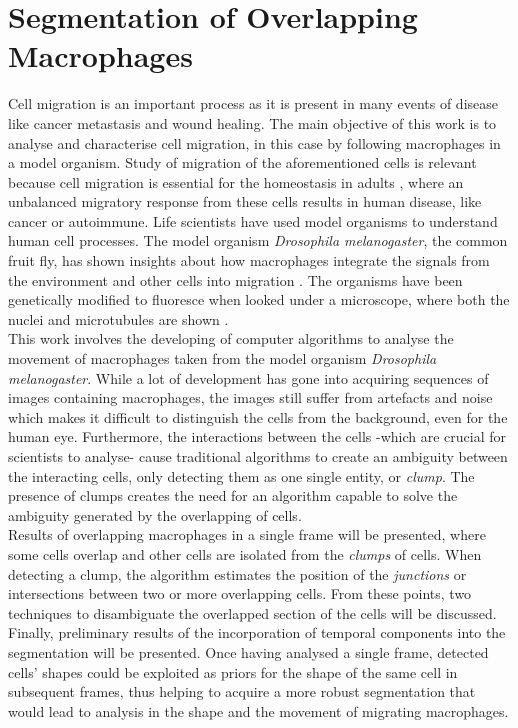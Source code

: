\section*{Segmentation of Overlapping Macrophages}
%
Cell migration is an important process as it is present in many events of
disease like cancer metastasis and wound healing.
The main objective of this work is to analyse and characterise cell
migration, in this case by following macrophages in a model organism.
Study of migration of the aforementioned cells is relevant because
cell migration is essential for the homeostasis in adults \cite{pocha2014},
where an unbalanced migratory response from these cells results in
human disease, like cancer or autoimmune.
Life scientists have used model organisms to understand human cell processes.
The model organism \emph{Drosophila melanogaster}, the common fruit fly,
has shown insights about how macrophages integrate the signals
from the environment and other cells into migration \cite{wood2017}.
The organisms have been genetically modified to fluoresce
when looked under a microscope, where both the nuclei and
microtubules are shown \cite{Stramer2010}.
\medskip\\
%
This work involves the developing of computer algorithms to analyse the
movement of macro\-phages taken from the model organism
\emph{Drosophila melanogaster}. While a lot of development
has gone into acquiring sequences of images containing macrophages,
the images still suffer from artefacts and noise which makes it difficult
to distinguish the cells from the background, even for the human eye.
Furthermore, the interactions between the cells
-which are crucial for scientists to analyse-
cause traditional algorithms \cite{Henry2013,lu2015,Caselles}
to create an ambiguity between the interacting cells, only detecting them
as one single entity, or \emph{clump}.
The presence of clumps creates the need for an algorithm capable to solve
the ambiguity generated by the overlapping of cells.
\medskip\\
%
Results of overlapping macrophages in a single frame will be
presented, where some cells overlap and other cells are
isolated from the \emph{clumps} of cells. When detecting a clump,
the algorithm estimates the position of the \emph{junctions} or intersections
between two or more overlapping cells. From these points, two techniques
to disambiguate the overlapped section of the cells will be discussed.
Finally, preliminary results of the incorporation of temporal components
into the segmentation will be presented. Once having analysed a single
frame, detected cells' shapes could be exploited as priors for the
shape of the same cell in subsequent frames, thus helping to acquire a
more robust segmentation that would lead to analysis in the shape and the
movement of migrating macrophages.
